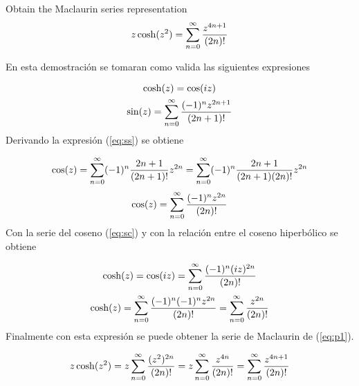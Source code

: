 \begin{problem}{1}
    Obtain the Maclaurin series representation
    \begin{gather}
        \label{eq:p1}z\cosh(z^2) = \sum_{n = 0}^{\infty} \frac{z^{4n+1}}{(2n)!}
    \end{gather}
\end{problem}
En esta demostración se tomaran como valida las siguientes expresiones 

\begin{gather}
    \label{eq:csh}\cosh(z) = \cos(iz)\\
    \label{eq:ss} \sin(z) = \sum_{n = 0}^{\infty} \frac{(-1)^n z^{2n+1}}{(2n+1)!}
\end{gather}
Derivando la expresión (\ref*{eq:ss}) se obtiene

\begin{gather*}
    \cos(z) = \sum_{n = 0}^{\infty} (-1)^n\frac{2n+1}{(2n+1)!}z^{2n} = \sum_{n = 0}^{\infty} (-1)^n\frac{2n+1}{(2n+1)(2n)!}z^{2n}
\end{gather*}
\begin{gather}
    \label{eq:sc}\cos(z) = \sum_{n = 0}^{\infty} \frac{(-1)^nz^{2n}}{(2n)!}
\end{gather}
Con la serie del coseno (\ref*{eq:sc}) y con la relación entre el coseno hiperbólico se obtiene

\begin{gather*}
    \cosh(z) = \cos(iz) = \sum_{n = 0}^{\infty} \frac{(-1)^n(iz)^{2n}}{(2n)!}\\
    \cosh(z) = \sum_{n = 0}^{\infty} \frac{(-1)^n(-1)^nz^{2n}}{(2n)!}= \sum_{n = 0}^{\infty} \frac{z^{2n}}{(2n)!}
\end{gather*}
Finalmente con esta expresión se puede obtener la serie de Maclaurin de (\ref*{eq:p1}).

\begin{mdframed}
    \vspace{-0.5cm}
    \begin{gather}
        z\cosh(z^2) = z\sum_{n = 0}^{\infty} \frac{(z^2)^{2n}}{(2n)!} = z\sum_{n = 0}^{\infty} \frac{z^{4n}}{(2n)!} =  \sum_{n = 0}^{\infty} \frac{z^{4n+1}}{(2n)!}
    \end{gather}    
\end{mdframed}


